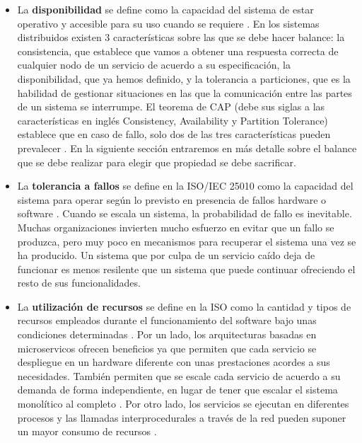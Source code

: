\documentclass[11pt,spanish,listoffigures]{tfgetsinf}
\begin{document}
\begin{itemize}

\item La \textbf{disponibilidad} se define como la capacidad del sistema de estar operativo y accesible para su uso cuando se requiere \cite{Standard2010}. En los sistemas distribuidos existen 3 características sobre las que se debe hacer balance: la consistencia, que establece que vamos a obtener una respuesta correcta de cualquier nodo de un servicio de acuerdo a su especificación, la disponibilidad, que ya hemos definido, y la tolerancia a particiones, que es la habilidad de gestionar situaciones en las que la comunicación entre las partes de un sistema se interrumpe. El teorema de CAP (debe sus siglas a las características en inglés Consistency, Availability y Partition Tolerance) establece que en caso de fallo, solo dos de las tres características pueden prevalecer \cite{Gilbert2012}. En la siguiente sección entraremos en más detalle sobre el balance que se debe realizar para elegir que propiedad se debe sacrificar.

\item La \textbf{tolerancia a fallos} se define en la ISO/IEC 25010 como la capacidad del sistema para operar según lo previsto en presencia de fallos hardware o software \cite{Standard2010}. Cuando se escala un sistema, la probabilidad de fallo es inevitable. Muchas organizaciones invierten mucho esfuerzo en evitar que un fallo se produzca, pero muy poco en mecanismos para recuperar el sistema una vez se ha producido. Un sistema que por culpa de un servicio caído deja de funcionar es menos resilente que un sistema que puede continuar ofreciendo el resto de sus funcionalidades.

\item La \textbf{utilización de recursos} se define en la ISO como la cantidad y tipos de recursos empleados durante el funcionamiento del software bajo unas condiciones determinadas \cite{Standard2010}. Por un lado, los arquitecturas basadas en microservicos ofrecen beneficios ya que permiten que cada servicio se despliegue en un hardware diferente con unas prestaciones acordes a sus necesidades. También permiten que se escale cada servicio de acuerdo a su demanda de forma independiente, en lugar de tener que escalar el sistema monolítico al completo \cite{DelaTorre2018}. Por otro lado, los servicios se ejecutan en diferentes procesos y las llamadas interprocedurales a través de la red pueden suponer un mayor consumo de recursos \cite{FowlerSusan}.


\end{itemize}
\end{document}
